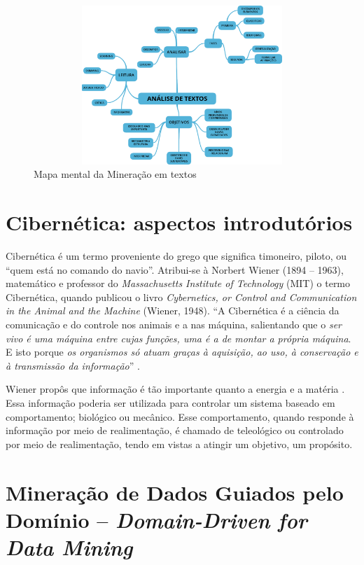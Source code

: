 \begin{figure}[htpb]
\centering
\caption{Mapa mental da Mineração em textos}
\includegraphics[width=120mm, height=60mm]{Figuras/BigData/Analise_Textos.png}
\end{figure}

\pagebreak

\section{Cibernética: aspectos introdutórios}

Cibernética é um termo proveniente do grego que significa timoneiro, piloto, ou ``quem está no comando do navio''.
Atribui-se à Norbert Wiener (1894 -- 1963), matemático e professor do \textit{Massachusetts Institute of Technology} (MIT) o termo Cibernética, quando publicou o livro 
\textit{Cybernetics, or Control and Communication in the Animal and the Machine} (Wiener, 1948).
``A Cibernética é a ciência da comunicação e do controle nos animais e a nas máquina, salientando que o \textit{ser vivo é uma máquina entre 
cujas funções, uma é a de montar a própria máquina}. E isto porque \textit{os organismos só atuam graças à aquisição, ao uso, à conservação 
e à transmissão da informação}''  \cite{Maltez1991}.

Wiener propôs que informação é tão importante quanto a energia e a matéria \cite{Salles2007}. Essa informação poderia ser utilizada para controlar um sistema baseado em 
comportamento; biológico ou mecânico. Esse comportamento, quando responde à informação por meio de realimentação, é chamado de teleológico ou controlado por meio de 
realimentação, tendo em vistas a atingir um objetivo, um propósito.


\section{Mineração de Dados Guiados pelo Domínio -- \textit{Domain-Driven for Data Mining}}

